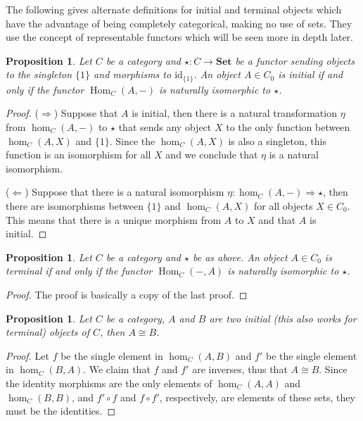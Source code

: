 \documentclass{scrartcl}
\newtheorem{prop}[thm]{Proposition}
\theoremstyle{definition}
\theoremstyle{remark}
\DeclareMathOperator{\Hom}{Hom}
\newcommand{\id}{\text{id}}
\begin{document}
The following gives alternate definitions for initial and terminal objects which have the advantage of being completely categorical, making no use of sets. They use the concept of representable functors which will be seen more in depth later.
\begin{prop}
    Let $C$ be a category and $\star: C\rightarrow \textbf{Set}$ be a functor sending objects to the singleton $\{1\}$ and morphisms to $\id_{\{1\}}$. An object $A \in C_0$ is initial if and only if the functor $\Hom_C(A,-)$ is naturally isomorphic to $\star$.
\end{prop}
\begin{proof}
    ($\Rightarrow$) Suppose that $A$ is initial, then there is a natural transformation $\eta$ from $\hom_C(A, -)$ to $\star$ that sends any object $X$ to the only function between $\hom_C(A,X)$ and $\{1\}$. Since the $\hom_C(A,X)$ is also a singleton, this function is an isomorphism for all $X$ and we conclude that $\eta$ is a natural isomorphism.
    
    ($\Leftarrow$) Suppose that there is a natural isomorphism $\eta: \hom_C(A,-)\Rightarrow \star$, then there are isomorphisms between $\{1\}$ and $\hom_C(A,X)$ for all objects $X \in C_0$. This means that there is a unique morphism from $A$ to $X$ and that $A$ is initial.
\end{proof}
\begin{prop}
    Let $C$ be a category and $\star$ be as above. An object $A \in C_0$ is terminal if and only if the functor $\Hom_C(-,A)$ is naturally isomorphic to $\star$.
\end{prop}
\begin{proof}
    The proof is basically a copy of the last proof.
\end{proof}

\begin{prop}
    Let $C$ be a category, $A$ and $B$ are two initial (this also works for terminal) objects of $C$, then $A \cong B$.
\end{prop}
\begin{proof}
    Let $f$ be the single element in $\hom_C(A,B)$ and $f'$ be the single element in $\hom_C(B,A)$. We claim that $f$ and $f'$ are inverses, thus that $A \cong B$. Since the identity morphisms are the only elements of $\hom_C(A,A)$ and $\hom_C(B,B)$, and $f' \circ f$ and $f\circ f'$, respectively, are elements of these sets, they must be the identities.
\end{proof}
\end{document}
